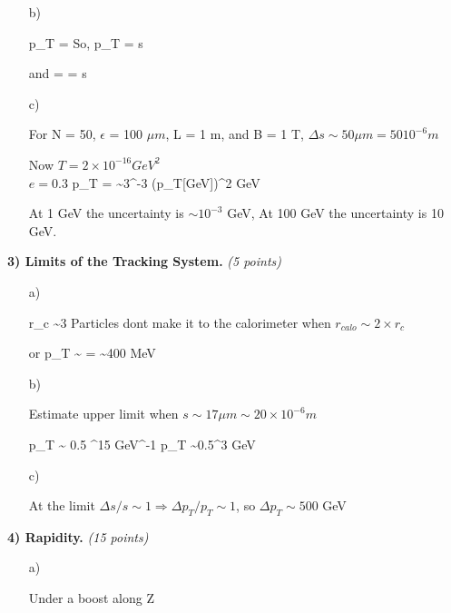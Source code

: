 {\begin{itemize}
{}
\item[b)]{
\be
p_T = 
\ee 
So,
\be
\Delta p_T =  \Delta s 
\ee 

and
\be
{} =  =  \Delta s 
\ee 

}
\item[c)]{
For N = 50, $\epsilon$ = 100 $\mu m$, L = 1 m, and B = 1 T, $\Delta s \sim 50 \mu m = 50 10^{-6} m$

Now
$T = 2 \times 10^{-16} GeV^2$\\
$e = 0.3$
\be
\Delta p_T =    \sim 3^{-3} (p_T[GeV])^2 GeV
\ee

At 1 GeV the uncertainty is $\sim 10^{-3}$ GeV,   At 100 GeV the uncertainty is 10 GeV.
}
\end{itemize}

\clearpage


\textbf{3) Limits of the Tracking System.} \hfill \textit{(5 points)}\\

\begin{itemize}
\item[a)]{
\be
r_c \sim 3 
\ee
Particles dont make it to the calorimeter when $r_{calo} \sim 2\times r_c$

or 
\be
p_T \sim {} =  \sim 400 MeV
\ee

}

\item[b)]{
Estimate upper limit when $s\sim17 \mu m \sim 20 \times 10^{-6} m$

\be
p_T \sim {}  0.5  ^{15} GeV^{-1}
p_T \sim 0.5^3 GeV
\ee

}
\item[c)]{
At the limit $\Delta s / s \sim 1  \Rightarrow \Delta p_T / p_T \sim 1 $, so $\Delta p_T \sim 500$ GeV


}
\end{itemize}

\vspace*{0.25in}

\textbf{4) Rapidity.} \hfill \textit{(15 points)}\\

\begin{itemize}
\item[a)]{
Under a boost along Z

}
\end{itemize}}
